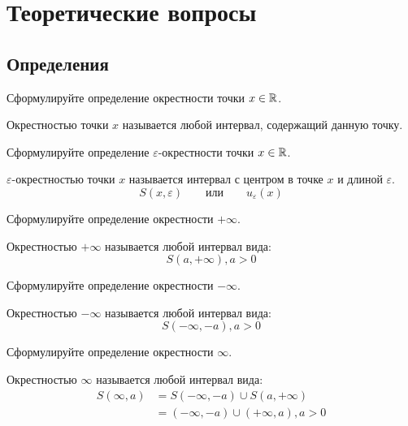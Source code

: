 
\section{Теоретические вопросы}

\subsection{Определения}

\begin{question}
  Сформулируйте определение окрестности точки $x \in \mathbb{R}$. 
\end{question}
\begin{answer}
  Окрестностью точки $x$ называется любой интервал, содержащий данную точку.
\end{answer}

\begin{question}
  Сформулируйте определение $\varepsilon$-окрестности точки $x \in \mathbb{R}$.
\end{question}
\begin{answer}
  $\varepsilon$-окрестностью точки $x$ называется интервал с центром в точке $x$ и длиной $\varepsilon$. \[
    S(x, \varepsilon) \qquad \text{или} \qquad u_{\varepsilon}(x)
  \] 
\end{answer}

\begin{question}
   Сформулируйте определение окрестности $+\infty$.
\end{question}
\begin{answer}
  Окрестностью $+\infty$ называется любой интервал вида: \[
  S(a, +\infty), a > 0
  \] 
\end{answer}

\begin{question}
   Сформулируйте определение окрестности $-\infty$.
\end{question}
\begin{answer}
  Окрестностью $-\infty$ называется любой интервал вида: \[
  S(-\infty, -a), a > 0
  \] 
\end{answer}

\begin{question}
   Сформулируйте определение окрестности $\infty$.
\end{question}
\begin{answer}
  Окрестностью $\infty$ называется любой интервал вида:
  \begin{align*}
    S(\infty, a) &= S(-\infty, -a) \cup S(a, +\infty) \\
            &= (-\infty, -a) \cup (+\infty, a), a > 0
  \end{align*}
\end{answer}

